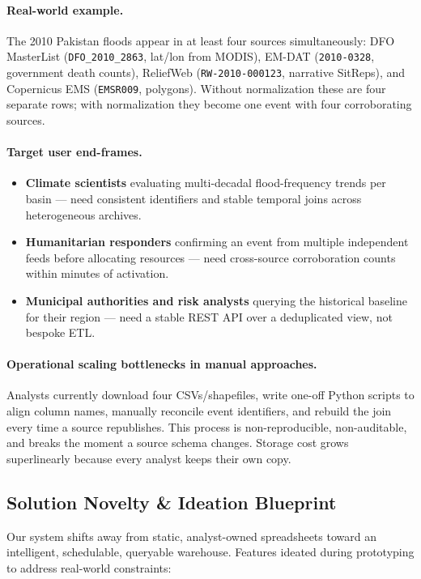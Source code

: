 \documentclass[11pt,a4paper]{article}
\begin{document}
\paragraph{Real-world example.} The 2010 Pakistan floods appear in at least
four sources simultaneously: DFO MasterList (\texttt{DFO\_2010\_2863},
lat/lon from MODIS), EM-DAT (\texttt{2010-0328}, government death counts),
ReliefWeb (\texttt{RW-2010-000123}, narrative SitReps), and Copernicus EMS
(\texttt{EMSR009}, polygons). Without normalization these are four separate
rows; with normalization they become one event with four corroborating
sources.

\paragraph{Target user end-frames.}
\begin{itemize}
    \item \textbf{Climate scientists} evaluating multi-decadal flood-frequency
    trends per basin --- need consistent identifiers and stable temporal joins
    across heterogeneous archives.
    \item \textbf{Humanitarian responders} confirming an event from multiple
    independent feeds before allocating resources --- need cross-source
    corroboration counts within minutes of activation.
    \item \textbf{Municipal authorities and risk analysts} querying the
    historical baseline for their region --- need a stable REST API over a
    deduplicated view, not bespoke ETL.
\end{itemize}

\paragraph{Operational scaling bottlenecks in manual approaches.}
Analysts currently download four CSVs/shapefiles, write one-off Python
scripts to align column names, manually reconcile event identifiers,
and rebuild the join every time a source republishes. This process is
non-reproducible, non-auditable, and breaks the moment a source schema
changes. Storage cost grows superlinearly because every analyst keeps
their own copy.

\subsection{Solution Novelty \& Ideation Blueprint}

Our system shifts away from static, analyst-owned spreadsheets toward an
intelligent, schedulable, queryable warehouse. Features ideated during
prototyping to address real-world constraints:
\end{document}
